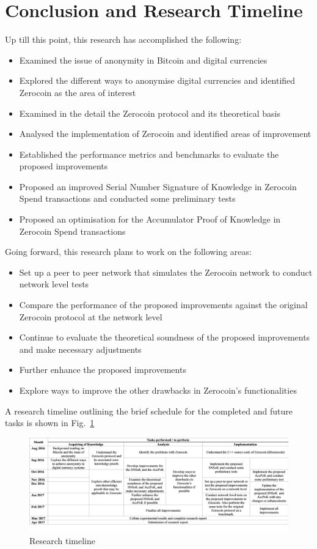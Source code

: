 \ifpdf
\graphicspath{{Conclusion/Figs/}}
\else
\graphicspath{{Conclusion/Figs/}}
\fi

\chapter*{Conclusion and Research Timeline}
Up till this point, this research has accomplished the following:
\begin{itemize}
	\item Examined the issue of anonymity in Bitcoin and digital currencies
	\item Explored the different ways to anonymise digital currencies and identified Zerocoin as the area of interest
	\item Examined in the detail the Zerocoin protocol and its theoretical basis
	\item Analysed the implementation of Zerocoin and identified areas of improvement
	\item Established the performance metrics and benchmarks to evaluate the proposed improvements 
	\item Proposed an improved Serial Number Signature of Knowledge in Zerocoin Spend transactions and conducted some preliminary tests
	\item Proposed an optimisation for the Accumulator Proof of Knowledge in Zerocoin Spend transactions
\end{itemize}

Going forward, this research plans to work on the following areas:
\begin{itemize}
	\item Set up a peer to peer network that simulates the Zerocoin network to conduct network level tests
	\item Compare the performance of the proposed improvements against the original Zerocoin protocol at the network level
	\item Continue to evaluate the theoretical soundness of the proposed improvements and make necessary adjustments
	\item Further enhance the proposed improvements
	\item Explore ways to improve the other drawbacks in Zerocoin’s functionalities
\end{itemize}

A research timeline outlining the brief schedule for the completed and future tasks is shown in Fig.~\ref{fig:timeline}  

\begin{figure}
	\centering
	\includegraphics[scale=0.14]{timeline}  
	\caption{Research timeline}
	\label{fig:timeline} 
\end{figure}


